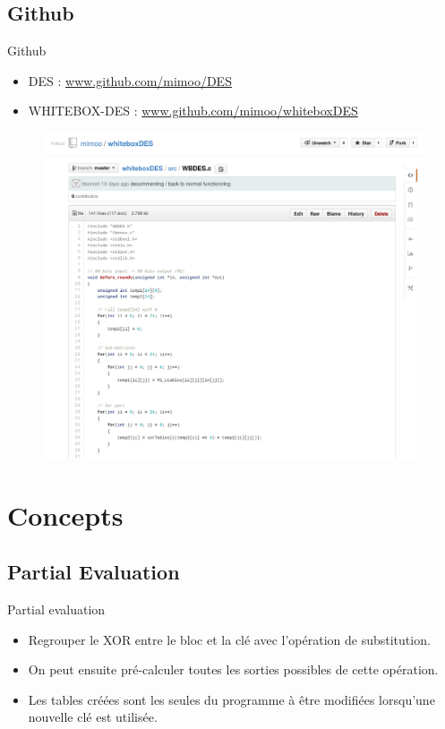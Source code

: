 \documentclass{beamer}
\begin{document}
\subsection{Github}
\begin{frame}{Github}
  \begin{itemize}
  \item DES : \url{www.github.com/mimoo/DES}
  \item WHITEBOX-DES : \url{www.github.com/mimoo/whiteboxDES}
  \end{itemize}

  \begin{figure}[h]
    \centering
    \includegraphics[scale=0.30]{./images/github.png}
  \end{figure}
\end{frame}

\section{Concepts}

\subsection{Partial Evaluation}
\begin{frame}{Partial evaluation}
  \begin{itemize}
  \item Regrouper le XOR entre le bloc et la clé avec l'opération de substitution.
  \item On peut ensuite pré-calculer toutes les sorties possibles de cette opération.
  \item Les tables créées sont les seules du programme à être modifiées lorsqu'une nouvelle clé est utilisée.
  \end{itemize}
\end{frame}
\end{document}
